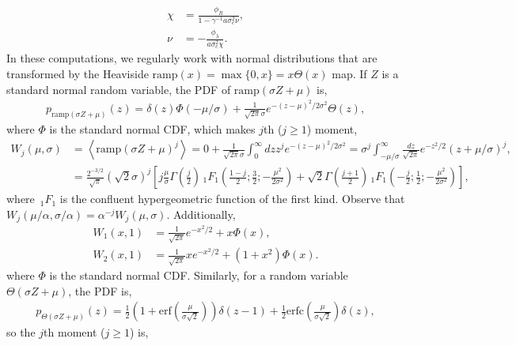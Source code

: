 \documentclass[10pt]{article}
\newcommand{\1}{\mathbf 1}
\newcommand{\ip}[1]{\left< #1 \right>}
\begin{document}
{\begin{align}
	\chi& = \frac{\phi_R}{1-\gamma^{-1}a\sigma_c^2\nu},
	\\
	\nu &= - \frac{\phi_\lambda}{a\sigma_c^2 \chi}.
\end{align}
In these computations, we regularly work with normal distributions that are transformed by the Heaviside $\mathrm{ramp}(x) = \max\{0,x\} = x \Theta(x)$ map.
If $Z$ is a standard normal random variable, the PDF of $\mathrm{ramp}(\sigma Z + \mu)$ is,
\begin{align}
	p_{\mathrm{ramp}(\sigma Z + \mu)}(z)
	=
	\delta(z) \Phi(-\mu/\sigma)
	+
	\frac{1}{\sqrt{2\pi}\sigma} e^{-(z-\mu)^2 / 2\sigma^2}\Theta(z),
\end{align}
where $\Phi$ is the standard normal CDF, which makes $j$th ($j\geq 1$) moment,
\begin{align}
	W_j(\mu,\sigma)
	&=
	\ip{\mathrm{ramp}(\sigma Z + \mu)^j}
	=
	0+
	\frac{1}{\sqrt{2\pi}\sigma}
	\int_0^\infty 
	dz
	z^j
	e^{-(z-\mu)^2/2\sigma^2}
	=
	\sigma^j
	\int_{-\mu/\sigma}^\infty 
	\frac{dz}{\sqrt{2\pi}}
	e^{-z^2/2}
	( z+\mu/\sigma)^j,
	\\
	&=
	\frac{2^{-3/2}}{\sqrt{\pi}}(\sqrt{2} \sigma)^j
	\left[j\frac{\mu}{\sigma }  \Gamma \left(\frac{j}{2}\right) \, _1F_1\left(\frac{1-j}{2};\frac{3}{2};-\frac{\mu ^2}{2 \sigma ^2}\right)
	+
	\sqrt{2} \Gamma \left(\frac{j+1}{2}\right) \, _1F_1\left(-\frac{j}{2};\frac{1}{2};-\frac{\mu ^2}{2 \sigma ^2}\right)\right],
\end{align}
where $\,_1 F_1$ is the confluent hypergeometric function of the first kind.
Observe that $W_j(\mu/\alpha , \sigma/\alpha) = \alpha^{-j}W_j(\mu,\sigma)$.
Additionally,
\begin{align}
	W_1(x,1)
	&=
	\frac{1}{\sqrt{2\pi}} e^{-x^2/2} + x \Phi(x),
	\\
	W_2(x,1)
	&=
	\frac{1}{\sqrt{2\pi}}x e^{-x^2/2} + (1+x^2) \Phi(x).
\end{align}
where $\Phi$ is the standard normal CDF.
Similarly, for a random variable $\Theta(\sigma Z + \mu)$, the PDF is,
\begin{align}
	p_{\Theta(\sigma Z + \mu)} (z)
	=
	\frac{1}{2}
	(
		1 + \mathrm{erf}\left(
			\frac{\mu}{\sigma\sqrt{2}}
		\right)
	)
	\delta(z-1)
	+
	\frac{1}{2}
	\mathrm{erfc}\left(
			\frac{\mu}{\sigma\sqrt{2}}
		\right)
	\delta(z),
\end{align}
so the $j$th moment ($j \geq 1$) is,
}
\end{document}
